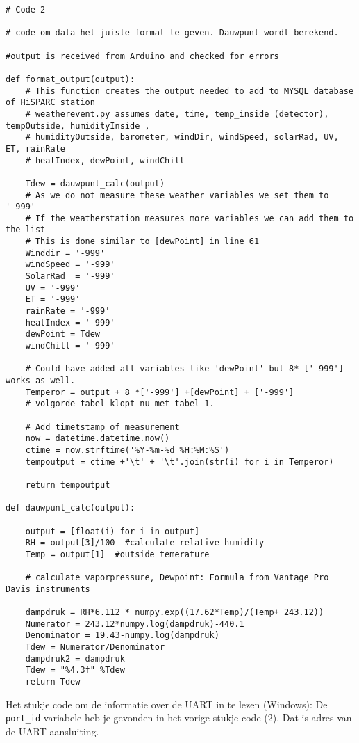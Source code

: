 \begin{verbatim}
# Code 2

# code om data het juiste format te geven. Dauwpunt wordt berekend.

#output is received from Arduino and checked for errors

def format_output(output):
    # This function creates the output needed to add to MYSQL database of HiSPARC station
    # weatherevent.py assumes date, time, temp_inside (detector), tempOutside, humidityInside ,
    # humidityOutside, barometer, windDir, windSpeed, solarRad, UV, ET, rainRate
    # heatIndex, dewPoint, windChill

    Tdew = dauwpunt_calc(output)
    # As we do not measure these weather variables we set them to '-999'
    # If the weatherstation measures more variables we can add them to the list
    # This is done similar to [dewPoint] in line 61
    Winddir = '-999'
    windSpeed = '-999'
    SolarRad  = '-999'
    UV = '-999'
    ET = '-999'
    rainRate = '-999'
    heatIndex = '-999'
    dewPoint = Tdew
    windChill = '-999'

    # Could have added all variables like 'dewPoint' but 8* ['-999'] works as well.
    Temperor = output + 8 *['-999'] +[dewPoint] + ['-999'] 
    # volgorde tabel klopt nu met tabel 1.

    # Add timetstamp of measurement
    now = datetime.datetime.now()
    ctime = now.strftime('%Y-%m-%d %H:%M:%S')
    tempoutput = ctime +'\t' + '\t'.join(str(i) for i in Temperor)

    return tempoutput

def dauwpunt_calc(output):

    output = [float(i) for i in output]
    RH = output[3]/100  #calculate relative humidity
    Temp = output[1]  #outside temerature

    # calculate vaporpressure, Dewpoint: Formula from Vantage Pro Davis instruments

    dampdruk = RH*6.112 * numpy.exp((17.62*Temp)/(Temp+ 243.12))
    Numerator = 243.12*numpy.log(dampdruk)-440.1
    Denominator = 19.43-numpy.log(dampdruk)
    Tdew = Numerator/Denominator
    dampdruk2 = dampdruk
    Tdew = "%4.3f" %Tdew
    return Tdew

\end{verbatim}

Het stukje code om de informatie over de UART in te lezen (Windows):
De \verb|port_id| variabele heb je gevonden in het vorige stukje code (2).
Dat is adres van de UART aansluiting.

